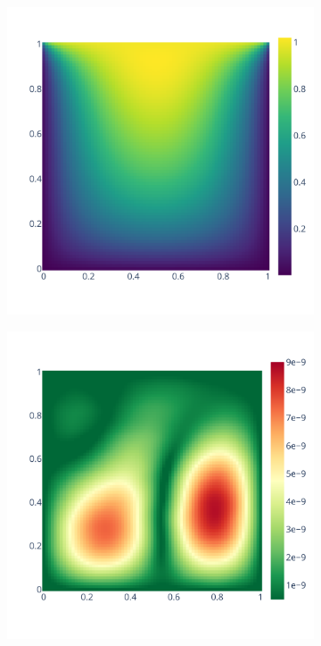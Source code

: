 \documentclass[11pt]{article}
\begin{document}
\begin{figure}
    \begin{subfigure}{0.45\linewidth}
    \includegraphics[width=\linewidth]{figure/root_finding/solution_mean_MCA.pdf}
    \caption{}
    \label{fig:my_label}
    \end{subfigure}
    \begin{subfigure}{0.45\linewidth}
    \includegraphics[width=\linewidth]{figure/root_finding/solution_std_MCA.pdf}    \caption{}

\end{subfigure}
\end{figure}
\end{document}
